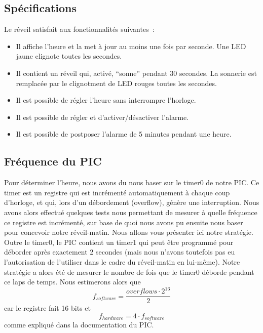 \documentclass[12pt,a4paper]{article}
\begin{document}
    \subsection{Spécifications}
    Le réveil satisfait aux fonctionnalités suivantes~:
    \begin{itemize}
    \item Il affiche l'heure et la met à jour au moins une fois par seconde. Une LED jaune clignote toutes les secondes.
    \item Il contient un réveil qui, activé, ``sonne'' pendant 30 secondes. La sonnerie est remplacée par le clignotment de LED rouges toutes les secondes.
    \item Il est possible de régler l'heure sans interrompre l'horloge.
    \item Il est possible de régler et d'activer/désactiver l'alarme.
    \item Il est possible de postposer l'alarme de 5 minutes pendant une heure.
    \end{itemize}
    
    \subsection{Fréquence du PIC}
    \label{subsec:freq}
    
    Pour déterminer l'heure, nous avons du nous baser sur le timer0 de notre PIC. Ce timer est un registre qui est incrémenté automatiquement à chaque coup d'horloge, et qui, lors d'un débordement (overflow), génère une interruption. Nous avons alors effectué quelques tests nous permettant de mesurer à quelle fréquence ce registre est incrémenté, sur base de quoi nous avons pu ensuite nous baser pour concevoir notre réveil-matin. Nous allons vous présenter ici notre stratégie.\\
  
 Outre le timer0, le PIC contient un timer1 qui peut être programmé pour déborder après exactement 2 secondes (mais nous n'avons toutefois pas eu l'autorisation de l'utiliser dans le cadre du réveil-matin en lui-même).  Notre stratégie a alors été de mesurer le nombre de fois que le timer0 déborde pendant ce laps de temps. Nous estimerons alors que $$f_{software} = \frac{overflows \cdot 2^{16}}{2}$$ car le registre fait 16 bits et $$f_{hardware} = 4 \cdot f_{software}$$ comme expliqué dans la documentation du PIC.\\
 
\end{document}
